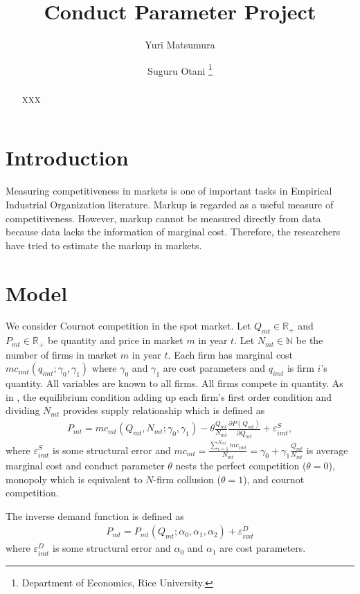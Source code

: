 \documentclass[11pt, a4paper]{article}
\title{Conduct Parameter Project}
\author{Yuri Matsumura \and Suguru Otani \footnote{Department of Economics, Rice University.}}
\begin{document}
\maketitle

\begin{abstract}
    XXX
\end{abstract}

\section{Introduction}
Measuring competitiveness in markets is one of important tasks in Empirical Industrial Organization literature.
Markup is regarded as a useful measure of competitiveness. 
However, markup cannot be measured directly from data because data lacks the information of marginal cost.
Therefore, the researchers have tried to estimate the markup in markets.



\section{Model}
We consider Cournot competition in the spot market. Let $Q_{mt}\in\mathbb{R}_{+}$ and $P_{mt}\in\mathbb{R}_{+}$ be quantity and price in market $m$ in year $t$. Let $N_{mt}\in\mathbb{N}$ be the number of firms in market $m$ in year $t$. Each firm has marginal cost $mc_{imt}(q_{imt};\gamma_0,\gamma_1)$ where $\gamma_0$ and $\gamma_1$ are cost parameters and $q_{imt}$ is firm $i$'s quantity. All variables are known to all firms. All firms compete in quantity. As in \cite{bresnahan1982oligopoly}, the equilibrium condition adding up each firm's first order condition and dividing $N_{mt}$ provides supply relationship which is defined as 
\begin{align}
    P_{m t}=mc_{mt}(Q_{mt},N_{mt};\gamma_0,\gamma_1)-\theta \frac{Q_{mt}}{N_{mt}} \frac{\partial P\left(Q_{m t}\right)}{\partial Q_{m t}}+\varepsilon_{imt}^{S},\label{eq:supply}
\end{align}
where $\varepsilon_{imt}^{S}$ is some structural error and $mc_{mt}=\frac{\sum_{i=1}^{N_{mt}}mc_{imt}}{N_{mt}}=\gamma_0+\gamma_1 \frac{Q_{mt}}{N_{mt}}$ is average marginal cost and conduct parameter $\theta$ nests the perfect competition ($\theta=0$), monopoly which is equivalent to $N$-firm collusion ($\theta=1$), and cournot competition.

The inverse demand function is defined as 
\begin{align}
    P_{mt}=P_{mt}(Q_{mt};\alpha_0,\alpha_1,\alpha_2)+\varepsilon_{imt}^{D}\label{eq:demand}
\end{align}
where $\varepsilon_{imt}^{D}$ is some structural error and $\alpha_0$ and $\alpha_1$ are cost parameters.
\end{document}

